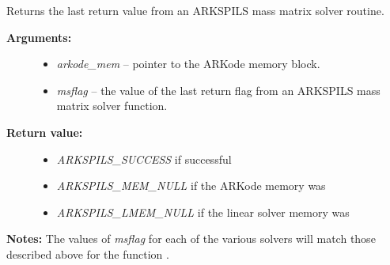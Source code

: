 \documentclass[letterpaper,10pt,english]{sphinxmanual}
\begin{document}
\begin{fulllineitems}
\label{c_interface/User_callable:c.ARKSpilsGetLastMassFlag}
Returns the last return value from an ARKSPILS mass matrix solver routine.
\begin{description}
\item[{\textbf{Arguments:}}] \leavevmode\begin{itemize}
\item {} 
\emph{arkode\_mem} -- pointer to the ARKode memory block.

\item {} 
\emph{msflag} -- the value of the last return flag from an
ARKSPILS mass matrix solver function.

\end{itemize}

\item[{\textbf{Return value:}}] \leavevmode\begin{itemize}
\item {} 
\emph{ARKSPILS\_SUCCESS} if successful

\item {} 
\emph{ARKSPILS\_MEM\_NULL} if the ARKode memory was 

\item {} 
\emph{ARKSPILS\_LMEM\_NULL} if the linear solver memory was 

\end{itemize}

\end{description}

\textbf{Notes:} The values of \emph{msflag} for each of the various solvers
will match those described above for the function
{\hyperref[c_interface/User_callable:c.ARKSpilsGetLastFlag]{\emph{}}}.

\end{fulllineitems}
\end{document}
